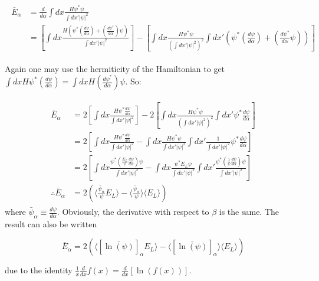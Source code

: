\documentclass[english, a4paper]{article}
\begin{document}
	\begin{align}
	\begin{split}
	\bar{E}_\alpha &= \frac{d}{d\alpha}\int dx \frac{H\psi^*\psi}{\int dx'|\psi|^2}\\
	&= \left[ \int dx\frac{H\left(\psi^*\left(\frac{d\psi}{d\alpha}\right) + \left(\frac{d\psi^*}{d\alpha}\right)\psi\right)}{\int dx'|\psi|^2} \right] - \left[ \int dx \frac{H\psi^*\psi}{\left(\int dx'|\psi|^2\right)^2}\int dx'\left( \psi^*\left(\frac{d\psi}{d\alpha}\right) + \left(\frac{d\psi^*}{d\alpha}\psi\right) \right) \right]
	\end{split}
	\end{align}
	
	Again one may use the hermiticity of the Hamiltonian to get $\int dx H \psi^*\left(\frac{d\psi}{d\alpha}\right) = \int dx H \left(\frac{d\psi^*}{d\alpha}\right)\psi$. So:
	
	\begin{align}
	\begin{split}
	\bar{E}_\alpha &= 2\left[ \int dx\frac{H\psi^*\frac{d\psi}{d\alpha}}{\int dx'|\psi|^2} \right] - 2\left[ \int dx \frac{H\psi^*\psi}{\left(\int dx'|\psi|^2\right)^2}\int dx' \psi^*\frac{d\psi}{d\alpha} \right]\\
	&= 2\left[ \int dx\frac{H\psi^*\frac{d\psi}{d\alpha}}{\int dx'|\psi|^2} - \int dx \frac{H\psi^*\psi}{\int dx'|\psi|^2}\int dx' \frac{1}{\int dx'|\psi|^2}\psi^*\frac{d\psi}{d\alpha} \right]\\
	&= 2\left[ \int dx\frac{\psi^*\left(\frac{E_L}{\psi}\frac{d\psi}{d\alpha}\right) \psi}{\int dx'|\psi|^2} - \int dx \frac{\psi^* E_L\psi}{\int dx'|\psi|^2}\int dx' \frac{\psi^*\left(\frac{1}{\psi}\frac{d\psi}{d\alpha}\right)\psi}{\int dx'|\psi|^2} \right]\\
	\therefore \bar{E}_\alpha &= 2\left( \langle\frac{\bar{\psi}_\alpha}{\psi}E_L\rangle -  \langle\frac{\bar{\psi}_\alpha}{\psi}\rangle\langle E_L\rangle \right)
	\end{split}
	\end{align}
	where $\bar{\psi}_\alpha \equiv \frac{d\psi}{d\alpha}$. Obviously, the derivative with respect to $\beta$ is the same. The result can also be written
	
	\begin{equation}
		\bar{E}_\alpha = 2\left( \langle[\overline{\ln(\psi)}]_\alpha E_L\rangle -  \langle[\overline{\ln(\psi)}]_\alpha\rangle\langle E_L\rangle \right)
	\end{equation}
	
	due to the identity $\frac{1}{x}\frac{d}{dx}f(x) = \frac{d}{dx}[\ln(f(x))]$.\\
	
\end{document}
